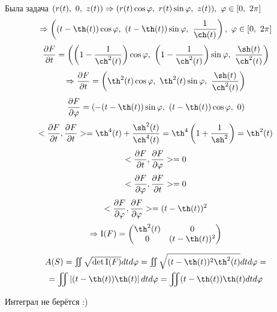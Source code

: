 \documentclass[main]{subfiles}
\begin{document}
    \begin{sol}
      Была задача $ (r(t),\ 0,\ z(t)) \Ra (r(t) \cos \varphi,\ r(t)\sin \varphi,\ z(t)),\ \varphi \in [0,\ 2\pi]$\\
      \[\Ra \Br{
        \Br{t - \th(t)}\cos \varphi,\
        \Br{t - \th(t)}\sin \varphi,\
        \dfrac{1}{\ch(t)}},\
      \varphi \in [0,\ 2\pi]\]
      \[\frac{\d F}{\d t} = \Br{
        \Br{1 - \frac{1}{\ch^2(t)}}\cos \varphi,\
        \Br{1 - \frac{1}{\ch^2(t)}}\sin \varphi,\
        \frac{\sh(t)}{\ch^2(t)}
      }\]
      \[\Ra \frac{\d F}{\d t} = \Br{
        \th^2 (t)\cos \varphi,\
        \th^2 (t)\sin \varphi,\
        \frac{\sh(t)}{\ch^2(t)}
      }\]
      \[\frac{\d F}{\d \varphi} = \Br{
        -(t-\th(t))\sin \varphi,\
        (t-\th(t))\cos \varphi,\
        0
      }\]
      \[<\frac{\d F}{\d t}, \frac{\d F}{\d t}> = \th^4 (t)+\frac{\sh^2 (t)}{\ch^4 (t)} = \th^4 \Br{1+\dfrac{1}{\sh^2}} =\th^2 (t)\]
      \[<\frac{\partial F}{\partial t}, \frac{\partial F}{\partial \varphi}> = 0\]
      \[<\frac{\partial F}{\partial \varphi}, \frac{\partial F}{\partial t}> = 0\]
      \[<\frac{\d F}{\d \varphi}, \frac{\d F}{\d \varphi}> = (t-\th(t))^2 \]
      \[\Ra \RNumb{1}(F) =
      \begin{pmatrix}
        {}\th^2 (t) & 0\\
        0 & (t-\th(t))^2
      \end{pmatrix}\]

      \begin{multline*}
        $$A(S) = \iint \sqrt{\det \RNumb{1}(F)} dt d\varphi =
        \iint \sqrt{(t-\th(t))^2 \th^2 (t)} dt d\varphi =\\
        =\iint \abs{(t-\th(t)) \th (t)} dt d\varphi = \iint (t-\th(t)) \th (t) dt d\varphi$$
      \end{multline*}

      Интеграл не берётся :)


\end{sol}
\end{document}
